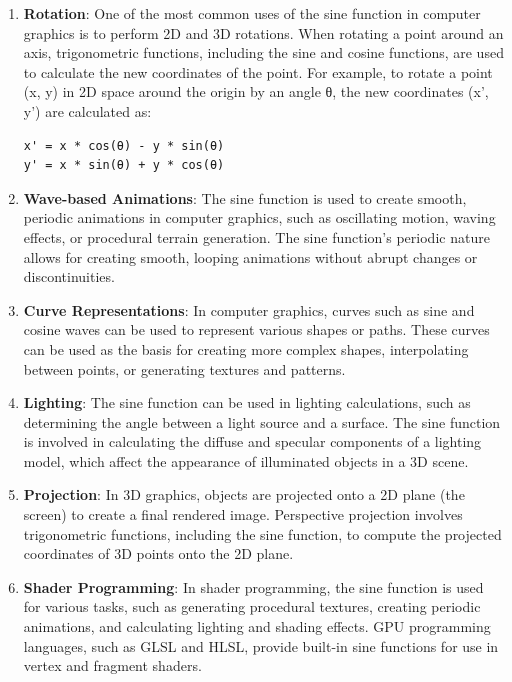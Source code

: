 \documentclass[
]{article}
\begin{document}
\begin{enumerate}
\def\labelenumi{\arabic{enumi}.}
\item
  \textbf{Rotation}: One of the most common uses of the sine function in
  computer graphics is to perform 2D and 3D rotations. When rotating a
  point around an axis, trigonometric functions, including the sine and
  cosine functions, are used to calculate the new coordinates of the
  point. For example, to rotate a point (x, y) in 2D space around the
  origin by an angle θ, the new coordinates (x', y') are calculated as:

\begin{verbatim}
x' = x * cos(θ) - y * sin(θ)
y' = x * sin(θ) + y * cos(θ)
\end{verbatim}
\item
  \textbf{Wave-based Animations}: The sine function is used to create
  smooth, periodic animations in computer graphics, such as oscillating
  motion, waving effects, or procedural terrain generation. The sine
  function's periodic nature allows for creating smooth, looping
  animations without abrupt changes or discontinuities.
\item
  \textbf{Curve Representations}: In computer graphics, curves such as
  sine and cosine waves can be used to represent various shapes or
  paths. These curves can be used as the basis for creating more complex
  shapes, interpolating between points, or generating textures and
  patterns.
\item
  \textbf{Lighting}: The sine function can be used in lighting
  calculations, such as determining the angle between a light source and
  a surface. The sine function is involved in calculating the diffuse
  and specular components of a lighting model, which affect the
  appearance of illuminated objects in a 3D scene.
\item
  \textbf{Projection}: In 3D graphics, objects are projected onto a 2D
  plane (the screen) to create a final rendered image. Perspective
  projection involves trigonometric functions, including the sine
  function, to compute the projected coordinates of 3D points onto the
  2D plane.
\item
  \textbf{Shader Programming}: In shader programming, the sine function
  is used for various tasks, such as generating procedural textures,
  creating periodic animations, and calculating lighting and shading
  effects. GPU programming languages, such as GLSL and HLSL, provide
  built-in sine functions for use in vertex and fragment shaders.
\end{enumerate}
\end{document}
